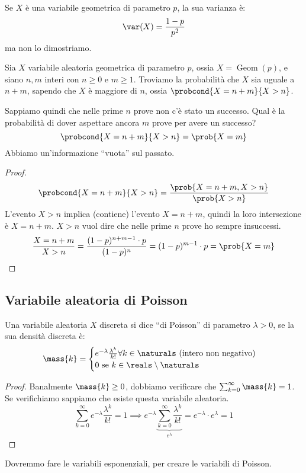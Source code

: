 Se $X$ \`e una variabile geometrica di parametro $p$, la sua varianza \`e:
\[
\var (X) = \frac{1 - p}{p^2}
\]
ma non lo dimostriamo.

\begin{theorem}
Sia $X$ variabile aleatoria geometrica di parametro $p$, ossia $X = \operatorname{Geom}(p)$, e siano $n, m$ interi con $n \ge 0$ e $m \ge 1$. Troviamo la probabilit\`a che $X$ sia uguale a $n + m$, sapendo che $X$ \`e maggiore di $n$, ossia $\probcond{X = n + m}{X > n}$.

Sappiamo quindi che nelle prime $n$ prove non c'\`e stato un successo. Qual \`e la probabilit\`a di dover aspettare ancora $m$ prove per avere un successo?
\[
\probcond{X = n + m}{X > n} = \prob{X = m}
\]
Abbiamo un'informazione ``vuota'' sul passato.
\end{theorem}
\begin{proof}
\[
\probcond{X = n + m}{X > n} = \frac{\prob{X = n + m, X > n}}{\prob{X > n}}
\]
L'evento $X > n$ implica (contiene) l'evento $X = n + m$, quindi la loro intersezione \`e $X = n + m$. $X > n$ vuol dire che nelle prime $n$ prove ho sempre insuccessi.
\[
\frac{X = n + m}{X > n} = \frac{(1-p)^{n + m - 1} \cdot p}{(1-p)^n} =
(1-p)^{m - 1} \cdot p = \prob{X = m}
\]
\end{proof}

\subsection{Variabile aleatoria di Poisson}

\begin{defn}
Una variabile aleatoria $X$ discreta si dice ``di Poisson'' di parametro $\lambda > 0$, se la sua densit\`a discreta \`e:
\[
\mass{k} =
\begin{cases}
e^{- \lambda} \frac{\lambda^k}{k!} \forall k \in \naturals \text{ (intero non negativo)} \\
0 \text{ se } k \in \reals \setminus \naturals
\end{cases}
\]
\end{defn}
\begin{proof}
Banalmente $\mass{k} \ge 0$, dobbiamo verificare che $\sum_{k = 0}^{\infty} \mass{k} = 1$. Se verifichiamo sappiamo che esiste questa variabile aleatoria.
\[
\sum_{k=0}^{\infty} e^{-\lambda} \frac{\lambda^k}{k!} = 1 \implies
e^{-\lambda} \underbrace{\sum_{k = 0}^{\infty} \frac{\lambda^k}{k!}}_{e^{\lambda}} = e^{-\lambda} \cdot e^{\lambda} = 1
\]
\end{proof}
Dovremmo fare le variabili esponenziali, per creare le variabili di Poisson.

